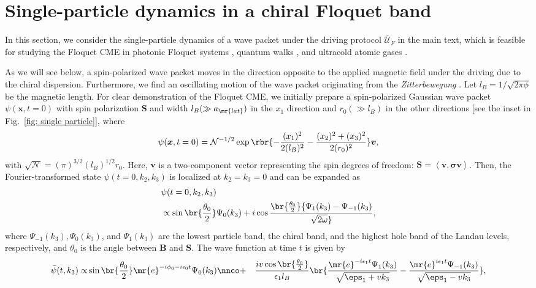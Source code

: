 \documentclass[
floatfix,
pra,
twocolumn,
reprint,
amsmath,amssymb,
aps,
footnote,
]{revtex4}
\begin{document}
\section{\label{sec: single}Single-particle dynamics in a chiral Floquet band}
In this section, we consider the single-particle dynamics of a wave packet under the driving protocol $\bar{\mathcal{U}}_F$ in the main text, which is feasible for studying the Floquet CME in photonic Floquet systems \cite{GaoF16, MukherjeeS17, MaczewskyL17, SunX18}, quantum walks \cite{KitagawaT10, KitagawaT12}, and ultracold atomic gases \cite{JotzuG14, Stuhl15, RoyS18}.


As we will see below, a spin-polarized wave packet moves in the direction opposite to the applied magnetic field under the driving due to the chiral dispersion.
Furthermore, we find an oscillating motion of the wave packet originating from the \textit{Zitterbewegung} \cite{SchrodingerE30}.
Let $l_B = 1/\sqrt{2 \pi \phi}$ be the magnetic length.
For clear demonstration of the Floquet CME, we initially prepare a spin-polarized Gaussian wave packet $\psi(\bm{x}, t=0)$ with spin polarization $\bm{S}$ and  width $l_B (\gg a_{\mr{lat}})$ in the $x_1$ direction and $r_0 (\gg l_B)$ in the other directions [see the inset in Fig.~\ref{fig: single particle}], where
\begin{align}
	\psi(\bm{x}, t=0) =
\mathcal{N}^{-1/2}
\exp\rbr{-{ (x_1)^2 \over 2 (l_B)^2} - { (x_2)^2 + (x_3)^2 \over 2 (r_0)^2}}\bm{v}
	,
\end{align}
with $\sqrt{\mathcal{N}} = (\pi)^{3/2} (l_B)^{1/2}r_0$.
Here, $\bm{v}$ is a two-component vector representing the spin degrees of freedom: $\bm{S}=\left<\bm{v}, \bm{\sigma} \bm{v} \right>$.
Then, the Fourier-transformed state $\psi(t=0, k_2, k_3)$ is localized at $k_2 = k_3 = 0$ and can be expanded as
\begin{align}
	&\psi(t=0, k_2, k_3)
	\nonumber \\
	&\propto
	\sin\br{{\theta_0 \over 2}} \Psi_0(k_3) +
	i \cos\br{{\theta_0 \over 2}}
	{\Psi_1(k_3) - \Psi_{-1}(k_3) \over \sqrt{2 \omega}}
	,
\end{align}
where $\Psi_{-1}(k_3), \Psi_0(k_3)$, and $\Psi_1(k_3)$ are the lowest particle band, the chiral band, and the highest hole band of the Landau levels, respectively,
and $\theta_0$ is the angle between $\bm{B}$ and $\bm{S}$.
The wave function at time $t$ is given by
\begin{align}
	\bar{\psi}(t, k_3) \propto &
 \sin\br{{\theta_0 \over 2}} \mr{e}^{-i \phi_0 - i \epsilon_0 t} \Psi_0(k_3)
\nnco
+ & {i v  \cos\br{{\theta_0 \over 2}} \over \epsilon_1 l_B}
 \br{
{ \mr{e}^{- i \epsilon_1 t} \Psi_1(k_3) \over \sqrt{ \eps_1 + v k_3} }
 - { \mr{e}^{i \epsilon_1 t} \Psi_{-1}(k_3) \over \sqrt{ \eps_1 - v k_3} }
},
\end{align}
\end{document}
